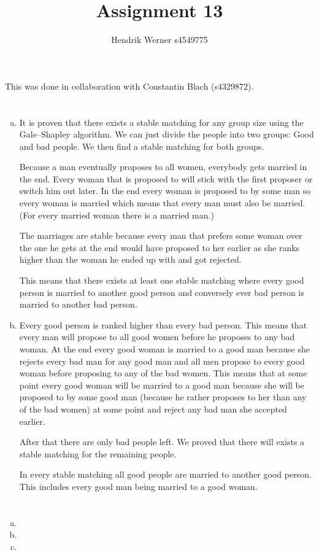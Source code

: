 \documentclass[12pt, a4paper]{article}
\title{Assignment 13}
\author{Hendrik Werner s4549775}
\begin{document}
\maketitle

This was done in collaboration with Constantin Blach (s4329872).

\section{} %
\begin{enumerate}[(a)]
	\item %
	It is proven that there exists a stable matching for any group size using the Gale–Shapley algorithm. We can just divide the people into two groups: Good and bad people. We then find a stable matching for both groups.

	Because a man eventually proposes to all women, everybody gets married in the end. Every woman that is proposed to will stick with the first proposer or switch him out later. In the end every woman is proposed to by some man so every woman is married which means that every man must also be married. (For every married woman there is a married man.)

	The marriages are stable because every man that prefers some woman over the one he gets at the end would have proposed to her earlier as she ranks higher than the woman he ended up with and got rejected.

	This means that there exists at least one stable matching where every good person is married to another good person and conversely ever bad person is married to another bad person.

	\item %
	Every good person is ranked higher than every bad person. This means that every man will propose to all good women before he proposes to any bad woman. At the end every good woman is married to a good man because she rejects every bad man for any good man and all men propose to every good woman before proposing to any of the bad women. This means that at some point every good woman will be married to a good man because she will be proposed to by some good man (because he rather proposes to her than any of the bad women) at some point and reject any bad man she accepted earlier.

	After that there are only bad people left. We proved that there will exists a stable matching for the remaining people.

	In every stable matching all good people are married to another good person. This includes every good man being married to a good woman.
\end{enumerate}

\section{} %

\section{} %

\section{} %
\begin{enumerate}[(a)]
	\item %
	\item %
	\item %
\end{enumerate}
\end{document}
